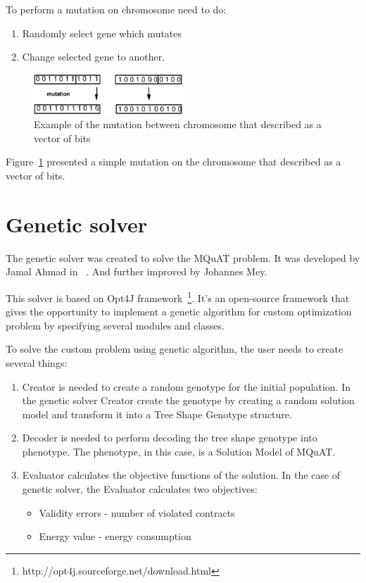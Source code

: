 To perform a mutation on chromosome need to do:

\begin{enumerate}
	\item Randomly select gene which mutates
	\item Change selected gene to another.
\end{enumerate}

\begin{figure}
	\centering
	\includegraphics[width=0.5\textwidth]{images/MutationVector.png}
	\caption[Example of the mutation]{Example of the mutation between chromosome that described as a vector of bits}
	\label{fig:MutationVector}
\end{figure}

Figure~\ref{fig:MutationVector} presented a simple mutation on the chromosome that described as a vector of bits.




\section{Genetic solver}\label{sec:GeneticSolver}
The genetic solver was created to solve the MQuAT problem. It was developed by Jamal Ahmad in ~\cite{ahmad18}. And further improved by Johannes Mey.

This solver is based on Opt4J framework~\footnote{http://opt4j.sourceforge.net/download.html}. It's an open-source framework that gives the opportunity to implement a genetic algorithm for custom optimization problem by specifying several modules and classes.

To solve the custom problem using genetic algorithm, the user needs to create several things:

\begin{enumerate}
	\item Creator is needed to create a random genotype for the initial population.
	In the genetic solver Creator create the genotype by creating a random solution model and transform it into a Tree Shape Genotype structure.
	\item Decoder is needed to perform decoding the tree shape genotype into phenotype. The phenotype, in this case, is a Solution Model of MQuAT.
	\item Evaluator calculates the objective functions of the solution. In the case of genetic solver, the Evaluator calculates two objectives: 
	
	\begin{itemize}
		\item Validity errors - number of violated contracts
		\item Energy value - energy consumption
	\end{itemize}
	
\end{enumerate}

